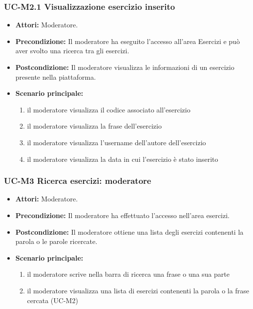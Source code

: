 \subsubsection{UC-M2.1 Visualizzazione esercizio inserito}
	\begin{itemize}
		\item \textbf{Attori:} Moderatore.
		\item \textbf{Precondizione:} Il moderatore ha eseguito l'accesso all'area Esercizi e può aver svolto una ricerca tra gli esercizi.
		\item \textbf{Postcondizione:} Il moderatore visualizza le informazioni di un esercizio presente nella piattaforma.
		\item \textbf{Scenario principale:}
			\begin{enumerate}
				\item il moderatore visualizza il codice associato all'esercizio
				\item il moderatore visualizza la frase dell'esercizio
				\item il moderatore visualizza l'username dell'autore dell'esercizio
				\item il moderatore visualizza la data in cui l'esercizio è stato inserito
			\end{enumerate}
	\end{itemize}		
		
\subsubsection{UC-M3 Ricerca esercizi: moderatore}
	\begin{itemize}
		\item \textbf{Attori:} Moderatore.
		\item \textbf{Precondizione:} Il moderatore ha effettuato l'accesso nell'area esercizi.
		\item \textbf{Postcondizione:} Il moderatore ottiene una lista degli esercizi contenenti la parola o le parole ricercate.
		\item \textbf{Scenario principale:}
			\begin{enumerate}
				\item il moderatore scrive nella barra di ricerca una frase o una sua parte
				\item il moderatore visualizza una lista di esercizi contenenti la parola o la frase cercata (UC-M2)
			\end{enumerate}
	\end{itemize}
	
